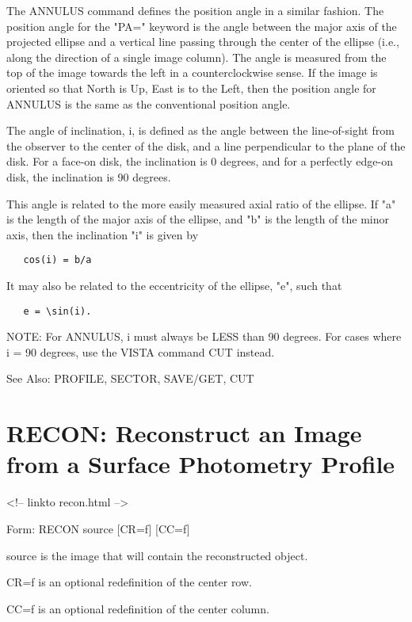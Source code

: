 The ANNULUS command defines the position angle in a similar fashion.  The
position angle for the "PA=" keyword is the angle between the major axis of
the projected ellipse and a vertical line passing through the center of the
ellipse (i.e., along the direction of a single image column).  The angle is
measured from the top of the image towards the left in a counterclockwise
sense.  If the image is oriented so that North is Up, East is to the Left,
then the position angle for ANNULUS is the same as the conventional
position angle.

The angle of inclination, i, is defined as the angle between the
line-of-sight from the observer to the center of the disk, and a line
perpendicular to the plane of the disk.  For a face-on disk, the
inclination is 0 degrees, and for a perfectly edge-on disk, the inclination
is 90 degrees.

This angle is related to the more easily measured axial ratio of the
ellipse.  If "a" is the length of the major axis of the ellipse, and "b" is
the length of the minor axis, then the inclination "i" is given by
\begin{verbatim}
   cos(i) = b/a
\end{verbatim}
It may also be related to the eccentricity of the ellipse, "e", such that
\begin{verbatim}
   e = \sin(i).
\end{verbatim}
NOTE: For ANNULUS, i must always be LESS than 90 degrees.  For cases where
i = 90 degrees, use the VISTA command CUT instead.

See Also: PROFILE, SECTOR, SAVE/GET, CUT


\section{RECON: Reconstruct an Image from a Surface Photometry Profile}
\begin{rawhtml}
<!-- linkto recon.html -->
\end{rawhtml}
\begin{command}
  \item[Form: RECON source {[CR=f]} {[CC=f]}\hfill]{}
  \item[source]{is the image that will contain the reconstructed object.}
  \item[CR=f]{is an optional redefinition of the center row.}
  \item[CC=f]{is an optional redefinition of the center column.}
\end{command}

